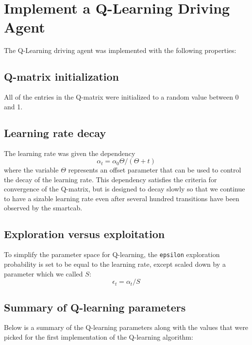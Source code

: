 \documentclass[conference]{IEEEtran}
\begin{document}
\section{Implement a Q-Learning Driving Agent}

The Q-Learning driving agent was implemented with the following properties:

\subsection{Q-matrix initialization}

All of the entries in the Q-matrix were initialized to a random value between
0 and 1. 

\subsection{Learning rate decay}

The learning rate was given the dependency 
\begin{equation}
    \alpha_{t} = \alpha_{0} \Theta / (\Theta + t)
\end{equation}
where the variable $\Theta$ represents an offset parameter that can be used
to control the decay of the learning rate. This dependency satisfies the
criteria for convergence of the Q-matrix, but is designed to decay slowly so
that we continue to have a sizable learning rate even after several hundred
transitions have been observed by the smartcab.

\subsection{Exploration versus exploitation}

To simplify the parameter space for Q-learning, the \verb"epsilon" exploration 
probability is set to be equal to the learning rate, except scaled down by a 
parameter which we called $S$:
\begin{equation}
    \epsilon_{t} = \alpha_{t} / S
\end{equation}

\subsection{Summary of Q-learning parameters}

Below is a summary of the Q-learning parameters along with the values that
were picked for the first implementation of the Q-learning algorithm:
\end{document}
